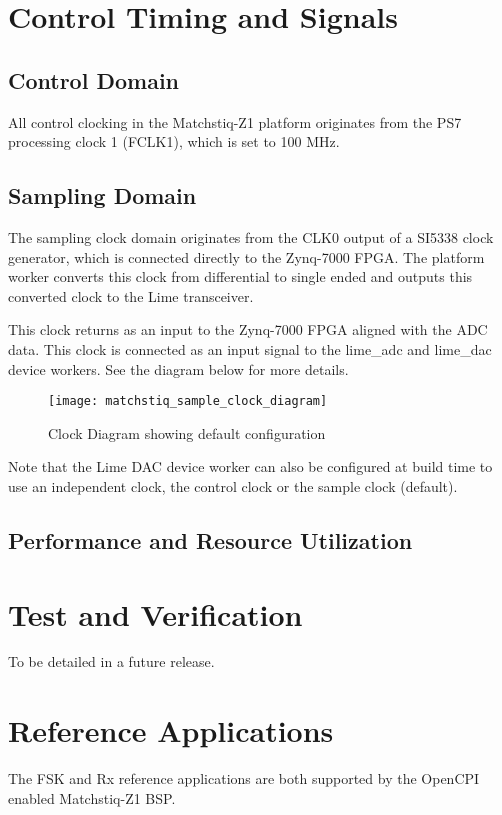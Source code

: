 \documentclass{article}
\edef\ecomp{matchstiq_z1}
\begin{document}
\pagebreak
\section*{Control Timing and Signals}
\subsection*{Control Domain}
All control clocking in the Matchstiq-Z1 platform originates from the PS7 processing clock 1 (FCLK1), which is set to 100 MHz.

\subsection*{Sampling Domain}
The sampling clock domain originates from  the CLK0 output of a SI5338 clock generator, which is connected directly to the Zynq-7000 FPGA. The platform worker converts this clock from differential to single ended and outputs this converted clock to the Lime transceiver.\par\medskip
\noindent This clock returns as an input to the Zynq-7000 FPGA aligned with the ADC data. This clock is connected as an input signal to the lime\_adc and lime\_dac device workers. See the diagram below for more details.\par\medskip
\begin{figure}[ht]
	\centerline{\texttt{[image: matchstiq\_sample\_clock\_diagram]}}
	\caption{Clock Diagram showing default configuration}
	\label{fig:clk}
\end{figure}
\noindent Note that the Lime DAC device worker can also be configured at build time to use an independent clock, the control clock or the sample clock (default).
\newpage

\begin{landscape}
\section*{Performance and Resource Utilization}

\end{landscape}
\section*{Test and Verification}
\begin{flushleft}
 To be detailed in a future release.
\end{flushleft}
\section*{Reference Applications}
The FSK and Rx reference applications are both supported by the OpenCPI enabled Matchstiq-Z1 BSP. 
\end{document}
